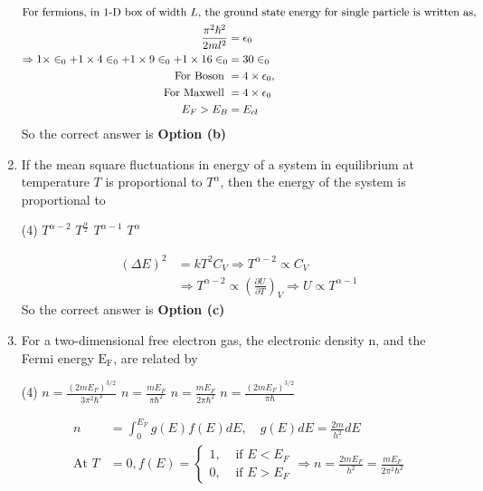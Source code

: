 \begin{enumerate}
\begin{answer}
\begin{align*}
		\intertext{For fermions, in 1-D box of width $L$, the ground state energy for single particle is written as,}
		\frac{\pi^{2} \hbar^{2}}{2 m l^{2}}&=\epsilon_{0}\\
		\Rightarrow 1 \times \in_{0}+1 \times 4 \in_{0}+1 \times 9 \in_{0}+1 \times 16 \in_{0}&=30 \in_{0}\\
		\text{ For Boson }&=4 \times \epsilon_{0},\\\text{ For Maxwell }&=4 \times \epsilon_{0}\\
		E_{F}>E_{B}&=E_{c l}
		\end{align*}
		So the correct answer is \textbf{Option (b)}
	\end{answer}
	\item If the mean square fluctuations in energy of a system in equilibrium at temperature $T$ is proportional to $T^{\alpha}$, then the energy of the system is proportional to
	{}
	\begin{tasks}(4)
		\task[\textbf{a.}] $T^{\alpha-2}$
		\task[\textbf{b.}] $T^{\frac{\alpha}{2}}$
		\task[\textbf{c.}] $T^{\alpha-1}$
		\task[\textbf{d.}] $T^{\alpha}$
	\end{tasks}
\begin{answer}
	\begin{align*}
	(\Delta E)^{2}&=k T^{2} C_{V} \Rightarrow T^{\alpha-2} \propto C_{V} \\&\Rightarrow T^{\alpha-2} \propto\left(\frac{\partial U}{\partial T}\right)_{V} \Rightarrow U \propto T^{\alpha-1}
	\end{align*}
	So the correct answer is \textbf{Option (c)}
\end{answer}
	\item For a two-dimensional free electron gas, the electronic density $\mathrm{n}$, and the Fermi energy $\mathrm{E}_{\mathrm{F}}$, are related by
	{}
	\begin{tasks}(4)
		\task[\textbf{a.}] $n=\frac{\left(2 m E_{F}\right)^{3 / 2}}{3 \pi^{2} \hbar^{3}}$
		\task[\textbf{b.}] $n=\frac{m E_{F}}{\pi \hbar^{2}}$
		\task[\textbf{c.}] $n=\frac{m E_{F}}{2 \pi \hbar^{2}}$
		\task[\textbf{d.}] $n=\frac{\left(2 m E_{F}\right)^{3 / 2}}{\pi \hbar}$
	\end{tasks}
	\begin{answer}
		\begin{align*}
		n&=\int_{0}^{E_{F}} g(E) f(E) d E, \quad g(E) d E=\frac{2 m}{h^{2}} d E\\
		\text{At }T&=0, f(E)=\left\{\begin{array}{ll}1, & \text { if } E<E_{F} \\ 0, & \text { if } E>E_{F}\end{array} \Rightarrow n=\frac{2 m E_{F}}{h^{2}}=\frac{m E_{F}}{2 \pi^{2} \hbar^{2}}\right.

\end{align*}
\end{answer}
\end{enumerate}
